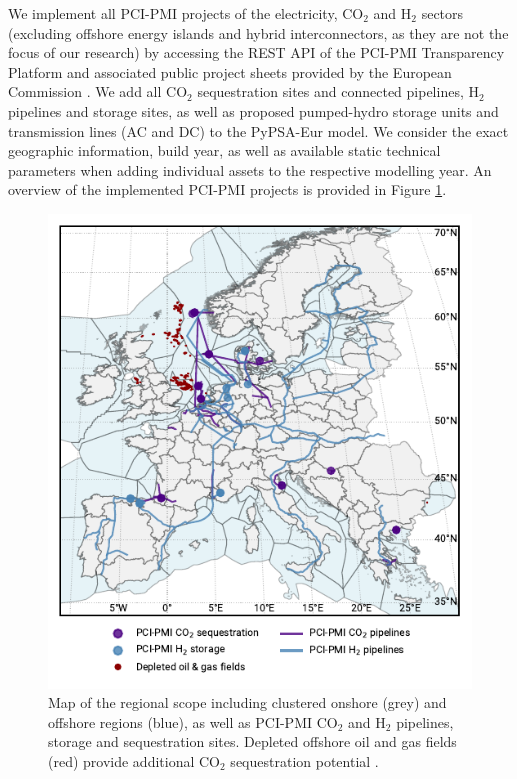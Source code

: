 \documentclass[pdflatex,sn-nature]{sn-jnl}%
\theoremstyle{thmstyleone}%
\theoremstyle{thmstyletwo}%
\theoremstyle{thmstylethree}%
\begin{document}
We implement all PCI-PMI projects of the electricity, CO$_2$ and H$_2$ sectors (excluding offshore energy islands and hybrid interconnectors, as they are not the focus of our research) by accessing the REST API of the PCI-PMI Transparency Platform and associated public project sheets provided by the European Commission \cite{europeancommissionPCIPMITransparencyPlatform2024}. We add all CO$_2$ sequestration sites and connected pipelines, H$_2$ pipelines and storage sites, as well as proposed pumped-hydro storage units and transmission lines (AC and DC) to the PyPSA-Eur model. We consider the exact geographic information, build year, as well as available static technical parameters when adding individual assets to the respective modelling year. An overview of the implemented PCI-PMI projects is provided in Figure \ref{fig:regional_scope_map}.
\begin{figure}[htbp]
  \centering
  \includegraphics{figures/map_adm_pcipmi}
  \caption{Map of the regional scope including clustered onshore (grey) and offshore regions (blue), as well as PCI-PMI CO$_2$ and H$_2$ pipelines, storage and sequestration sites. Depleted offshore oil and gas fields (red) provide additional CO$_2$ sequestration potential \cite{hofmannH2CO2Network2025}.}
  \label{fig:regional_scope_map}
\end{figure}
\end{document}
